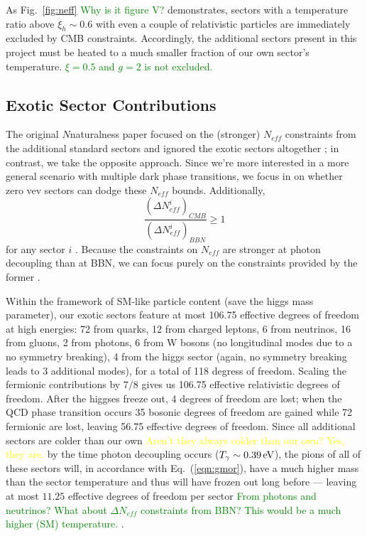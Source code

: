 \documentclass[nofootinbib,twocolumn,preprintnumbers]{revtex4-1}
\begin{document}
As Fig.~\ref{fig:neff} \textcolor{green}{Why is it figure V?} demonstrates, sectors with a temperature ratio above $\xi_h\sim 0.6$ with even a couple of relativistic particles are immediately excluded by CMB constraints. Accordingly, the additional sectors present in this project must be heated to a much smaller fraction of our own sector's temperature. \textcolor{green}{$\xi=0.5$ and $g=2$ is not excluded.}

\subsection{Exotic Sector Contributions}

The original $N$naturalness paper focused on the (stronger) $N_{eff}$ constraints from the additional standard sectors and ignored the exotic sectors altogether \cite{Arkani-Hamed:2016rle}; in contrast, we take the opposite approach. Since we're more interested in a more general scenario with multiple dark phase transitions, we focus in on whether zero vev sectors can dodge these $N_{eff}$ bounds. Additionally, 
\begin{equation}
\frac{(\Delta N^i_{eff})_{CMB}}{(\Delta N^i_{eff})_{BBN}} \geq 1
\end{equation}
for any sector $i$ \cite{Arkani-Hamed:2016rle}. Because the constraints on $N_{eff}$ are stronger at photon decoupling than at BBN, we can focus purely on the constraints provided by the former \cite{Aghanim:2018eyx}.

Within the framework of SM-like particle content (save the higgs mass parameter), our exotic sectors feature at most 106.75 effective degrees of freedom at high energies: 72 from quarks,  12 from charged leptons, 6 from neutrinos, 16 from gluons, 2 from photons, 6 from W bosons (no longitudinal modes due to a no symmetry breaking), 4 from the higgs sector (again, no symmetry breaking leads to 3 additional modes), for a total of 118 degress of freedom. Scaling the fermionic contributions by $7/8$ gives us 106.75 effective relativistic degrees of freedom.  After the higgses freeze out, 4 degrees of freedom are lost; when the QCD phase transition occurs 35 bosonic degrees of freedom are gained while 72 fermionic are lost, leaving 56.75 effective degrees of freedom. Since all additional sectors are colder than our own \textcolor{yellow}{Aren't they always colder than our own? Yes, they are.} by the time photon decoupling occurs ($T_\gamma \sim 0.39 \,{\rm eV}$), the pions of all of these sectors will, in accordance with Eq.~(\ref{eqn:gmor}), have a much higher mass than the sector temperature and thus will have frozen out long before --- leaving at most $11.25$ effective degrees of freedom per sector \textcolor{green}{From photons and neutrinos? What about $\Delta N_{eff}$ constraints from BBN? This would be a much higher (SM) temperature.} .
\end{document}
